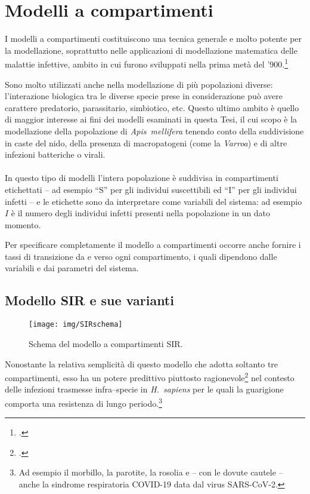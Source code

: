 \section{Modelli a compartimenti}
I modelli a compartimenti costituiscono una tecnica generale e molto potente per la modellazione, soprattutto nelle
applicazioni di modellazione matematica delle malattie infettive, ambito in cui furono sviluppati nella prima metà
del '900.\footcite{kmk,kdg}

Sono molto utilizzati anche nella modellazione di più popolazioni diverse: l'interazione biologica tra le diverse specie
prese in considerazione può avere carattere predatorio, parassitario, simbiotico, etc.
Questo ultimo ambito è quello di maggior interesse ai fini dei modelli esaminati in questa Tesi, il cui scopo è
la modellazione della popolazione di \emph{Apis~mellifera} tenendo conto della suddivisione in caste del nido, della
presenza di macropatogeni (come la \emph{Varroa}) e di altre infezioni batteriche o virali.

\paragraph{}
In questo tipo di modelli l'intera popolazione è suddivisa in compartimenti etichettati -- ad esempio ``S'' per gli
individui suscettibili ed ``I'' per gli individui infetti -- e le etichette sono da interpretare come variabili del sistema:
ad esempio $I$ è il numero degli individui infetti presenti nella popolazione in un dato momento.

Per specificare completamente il modello a compartimenti occorre anche fornire i tassi di transizione da e verso ogni
compartimento, i quali dipendono dalle variabili e dai parametri del sistema.

\subsection{Modello SIR e sue varianti}
\begin{figure}[hbt]
    \centering
    \texttt{[image: img/SIRschema]}

    \caption{Schema del modello a compartimenti SIR.}
    \label{img:SIRscheme}
\end{figure}

Nonostante la relativa semplicità di questo modello che adotta soltanto tre compartimenti, esso ha un potere predittivo
piuttosto ragionevole\footcite{chinaVirus} nel contesto delle infezioni trasmesse infra--specie in \emph{H.~sapiens}
per le quali la guarigione comporta una resistenza di lungo periodo.\footnote{Ad esempio il morbillo, la parotite,
la rosolia e -- con le dovute cautele -- anche la sindrome respiratoria COVID-19 data dal virus SARS-CoV-2.}

